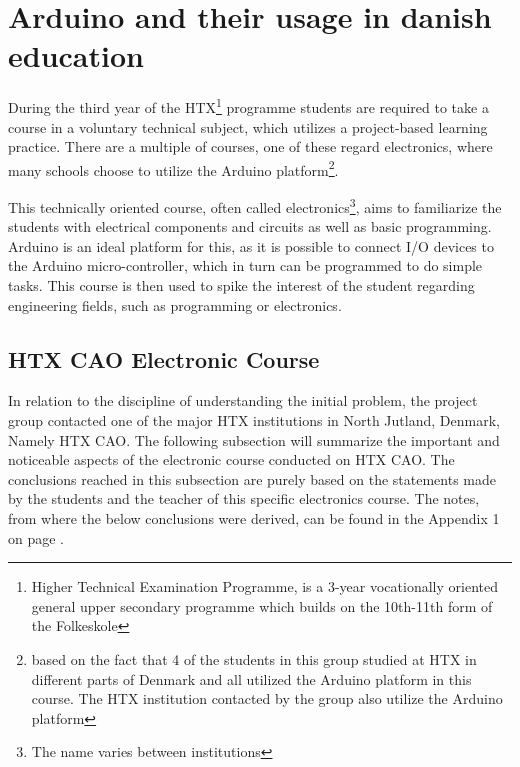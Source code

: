 
\section{Arduino and their usage in danish education}
During the third year of the HTX\footnote{Higher Technical Examination Programme, is a 3-year vocationally oriented general upper secondary programme which builds on the 10th-11th form of the Folkeskole\cite{htx_wiki}} programme students are required to take a course in a voluntary technical subject, which utilizes a project-based learning practice. 
There are a multiple of courses, one of these regard electronics, where many schools choose to utilize the Arduino platform\footnote{based on the fact that 4 of the students in this group studied at HTX in different parts of Denmark and all utilized the Arduino platform in this course. 
The HTX institution contacted by the group also utilize the Arduino platform}\cite{holstebro_education}.

This technically oriented course, often called electronics\footnote{The name varies between institutions}, aims to familiarize the students with electrical components and circuits as well as basic programming.\cite{holstebro_electronic}
Arduino is an ideal platform for this, as it is possible to connect I/O devices to the Arduino micro-controller, which in turn can be programmed to do simple tasks. 
This course is then used to spike the interest of the student regarding engineering fields, such as programming or electronics.


\subsection{HTX CAO Electronic Course}
In relation to the discipline of understanding the initial problem, the project group contacted one of the major HTX institutions in North Jutland, Denmark, Namely HTX CAO. 
The following subsection will summarize the important and noticeable aspects of the electronic course conducted on HTX CAO. 
The conclusions reached in this subsection are purely based on the statements made by the students and the teacher of this specific electronics course.
The notes, from where the below conclusions were derived, can be found in the Appendix 1 on page \pageref{Interviews}.

